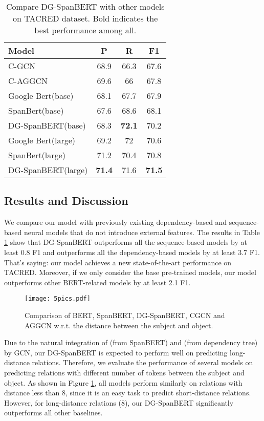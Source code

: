 \documentclass{article}
\begin{document}
\begin{table}[ht]
	\centering
\begin{tabular}{lccc}
	\hline
    \textbf{Model} & \textbf{P} & \textbf{R} & \textbf{F1}   \\
	\hline
	C-GCN & 68.9& 66.3& 67.6\\
	C-AGGCN & 69.6& 66 & 67.8\\
	\hline
	Google Bert(base) & 68.1 & 67.7 & 67.9 \\
    SpanBert(base) & 67.6  & 68.6 & 68.1\\
    DG-SpanBERT(base) & 68.3 & \textbf{72.1} & 70.2\\
    \hline
    Google Bert(large) &69.2 & 72 & 70.6\\
    SpanBert(large) &71.2& 70.4 & 70.8\\
    
    DG-SpanBERT(large) &\textbf{71.4} &71.6 &\textbf{71.5}\\
   
    \hline
	  \end{tabular}
	\caption{Compare DG-SpanBERT with other models on TACRED dataset.  Bold indicates the best performance among all. } 
    \label{Tab:01}
		 \end{table}
\subsection{Results and Discussion}
We compare our model with previously existing dependency-based and sequence-based neural models that do not introduce external features. The results in Table \ref{Tab:01} show that   DG-SpanBERT  outperforms all the sequence-based models by at least 0.8 F1 and outperforms all the dependency-based models by at least 3.7 F1. That's saying: our model achieves a new state-of-the-art performance on  TACRED. Moreover, if we only consider the base pre-trained models, our model outperforms other BERT-related models by at least 2.1 F1. 

\begin{figure}[ht]

\centering
    \texttt{[image: 5pics.pdf]}
\caption{Comparison of BERT, SpanBERT, DG-SpanBERT, CGCN and AGGCN w.r.t. the distance between the subject and object.}
\label{fig:figure2}
\end{figure}
Due to the natural integration of  (from SpanBERT) and  (from dependency tree) by GCN, our DG-SpanBERT is expected to perform well on predicting long-distance relations. Therefore, we evaluate the performance of several models on predicting relations with different number of tokens between the subject and object. As shown in Figure \ref{fig:figure2}, all models perform similarly on relations with distance less than 8, since it is an easy task to predict short-distance relations. However, for long-distance relations (8), our DG-SpanBERT significantly outperforms all other baselines.
\end{document}
